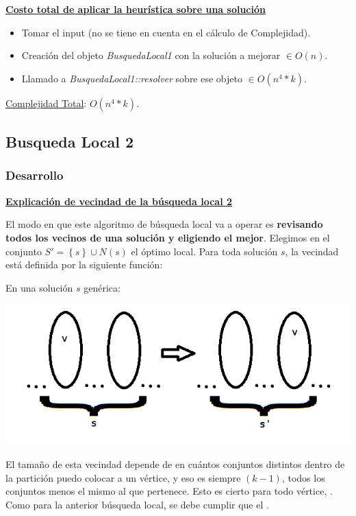 \documentclass[10pt,a4paper]{article}
\begin{document}
\textbf{\underline{Costo total de aplicar la heurística sobre una solución}}

\begin{itemize}
\item Tomar el input (no se tiene en cuenta en el cálculo de Complejidad).
\item Creación del objeto \textit{BusquedaLocal1} con la solución a mejorar $\in O(n)$.
\item Llamado a \textit{BusquedaLocal1::resolver} sobre ese objeto $\in O(n^4*k)$.
\end{itemize}

\underline{Complejidad Total}: $O(n^4*k)$.

\newpage
\subsection{Busqueda Local 2}
\subsubsection{Desarrollo}
\noindent \textbf{\underline{Explicación de vecindad de la búsqueda local 2}}

El modo en que este algoritmo de búsqueda local va a operar es \textbf{revisando todos los vecinos de una solución y eligiendo el mejor}. Elegimos en el conjunto $S' = \left\{s\right\} \cup N(s)$ el óptimo local. Para toda solución $s$, la vecindad está definida por la siguiente función:

\textbf{}

En una solución $s$ genérica:

\includegraphics[scale=.75]{Vecindad2.png}

El tamaño de esta vecindad depende de en cuántos conjuntos distintos dentro de la partición puedo colocar a un vértice, y eso es siempre $(k-1)$, todos los conjuntos menos el mismo al que pertenece. Esto es cierto para todo vértice, \textbf{}. Como para la anterior búsqueda local, se debe cumplir que el \textbf{}.
\end{document}
